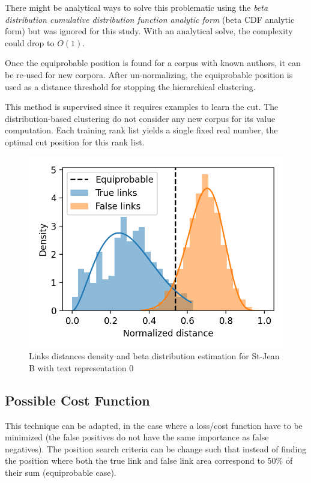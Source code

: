 There might be analytical ways to solve this problematic using the \textit{beta distribution cumulative distribution function analytic form} (beta CDF analytic form) but was ignored for this study.
With an analytical solve, the complexity could drop to $O(1)$.

Once the equiprobable position is found for a corpus with known authors, it can be re-used for new corpora.
After un-normalizing, the equiprobable position is used as a distance threshold for stopping the hierarchical clustering.

This method is supervised since it requires examples to learn the cut.
The distribution-based clustering do not consider any new corpus for its value computation.
Each training rank list yields a single fixed real number, the optimal cut position for this rank list.

\begin{figure}
  \caption{Links distances density and beta distribution estimation for St-Jean B with text representation 0}
  \label{fig:links_score_density}
  \includegraphics[width=\linewidth]{img/links_score_density.png}
\end{figure}

\subsection{Possible Cost Function}

This technique can be adapted, in the case where a loss/cost function have to be minimized (the false positives do not have the same importance as false negatives).
The position search criteria can be change such that instead of finding the position where both the true link and false link area correspond to $50\%$ of their sum (equiprobable case).

